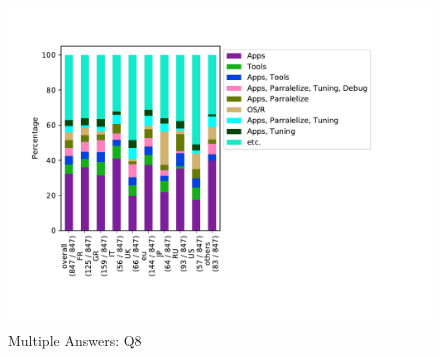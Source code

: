\begin{figure}[htb]
\begin{center}
\includegraphics[width=14cm]{../pdfs/Q8-mans.pdf}
\caption{Multiple Answers: Q8}
\label{fig:Q8-mans}
\end{center}
\end{figure}

